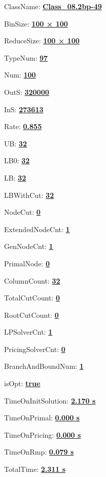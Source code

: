 \documentclass[11pt]{article}
\begin{document}
\pagestyle{empty}


ClassName: \underline{\textbf{Class_08.2bp-49}}
\par
BinSize: \underline{\textbf{100 × 100}}
\par
ReduceSize: \underline{\textbf{100 × 100}}
\par
TypeNum: \underline{\textbf{97}}
\par
Num: \underline{\textbf{100}}
\par
OutS: \underline{\textbf{320000}}
\par
InS: \underline{\textbf{273613}}
\par
Rate: \underline{\textbf{0.855}}
\par
UB: \underline{\textbf{32}}
\par
LB0: \underline{\textbf{32}}
\par
LB: \underline{\textbf{32}}
\par
LBWithCut: \underline{\textbf{32}}
\par
NodeCut: \underline{\textbf{0}}
\par
ExtendedNodeCnt: \underline{\textbf{1}}
\par
GenNodeCnt: \underline{\textbf{1}}
\par
PrimalNode: \underline{\textbf{0}}
\par
ColumnCount: \underline{\textbf{32}}
\par
TotalCutCount: \underline{\textbf{0}}
\par
RootCutCount: \underline{\textbf{0}}
\par
LPSolverCnt: \underline{\textbf{1}}
\par
PricingSolverCnt: \underline{\textbf{0}}
\par
BranchAndBoundNum: \underline{\textbf{1}}
\par
isOpt: \underline{\textbf{true}}
\par
TimeOnInitSolution: \underline{\textbf{2.170 s}}
\par
TimeOnPrimal: \underline{\textbf{0.000 s}}
\par
TimeOnPricing: \underline{\textbf{0.000 s}}
\par
TimeOnRmp: \underline{\textbf{0.079 s}}
\par
TotalTime: \underline{\textbf{2.311 s}}
\par
\newpage


\end{document}
